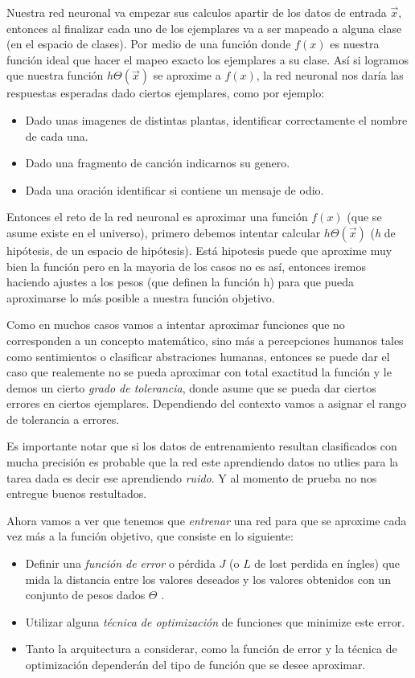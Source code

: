 Nuestra red neuronal va empezar sus calculos apartir de los datos de entrada $\vec{x}$, entonces al finalizar cada uno de los ejemplares va a ser mapeado a alguna clase (en el espacio de clases). Por medio de una función donde $f(x)$ es nuestra función ideal que hacer el mapeo exacto los ejemplares a su clase. Así si logramos que nuestra función $h\Theta(\vec{x})$ se aproxime a $f(x)$, la red neuronal nos daría las respuestas esperadas dado ciertos ejemplares, como por ejemplo:
\begin{itemize}
 \item Dado unas imagenes de distintas plantas, identificar correctamente el nombre de cada una.
 \item Dado una fragmento de canción indicarnos su genero.
 \item Dada una oración identificar si contiene un mensaje de odio.
\end{itemize}

Entonces el reto de la red neuronal es aproximar una función $f(x)$ (que se asume existe en el universo),
primero debemos intentar calcular $h\Theta(\vec{x})$ (\emph{h} de hipótesis, de un espacio de hipótesis). Está hipotesis puede que aproxime muy bien la función pero en la mayoria de los casos no es así, entonces iremos haciendo ajustes a los pesos (que definen la función h) para que pueda aproximarse lo más posible a nuestra función objetivo.


Como en muchos casos vamos a intentar aproximar funciones que no corresponden a un concepto matemático, sino más a percepciones humanos tales como sentimientos o clasificar abstraciones humanas, entonces se puede dar el caso que realemente no se pueda aproximar con total exactitud la función y le demos un cierto \emph{grado de tolerancia}, donde asume que se pueda dar ciertos errores en ciertos ejemplares. Dependiendo del contexto vamos a asignar el rango de tolerancia a errores.

Es importante notar que si los datos de entrenamiento resultan clasificados con mucha precisión es probable que la red este aprendiendo datos no utlies para la tarea dada es decir ese aprendiendo \emph{ruido}. Y al momento de prueba no nos entregue buenos restultados.

Ahora vamos a ver que tenemos que \emph{entrenar} una red para que se aproxime cada vez más a la función objetivo, que consiste en lo siguiente:
\begin{itemize}
 \item  Definir una \emph{función de error} o pérdida $J$ (o $L$ de lost perdida en íngles) que mida la distancia entre los valores
deseados y los valores obtenidos con un conjunto de pesos dados $\Theta$ .
 \item Utilizar alguna \emph{técnica de optimización} de funciones que minimize este error.
 \item Tanto la arquitectura a considerar, como la función de error y la técnica de
optimización dependerán del tipo de función que se desee aproximar.
\end{itemize}


